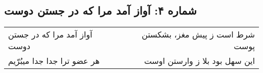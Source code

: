 \begin{center}
\section*{شماره ۴: آواز آمد مرا که در جستن دوست}
\label{sec:004}
\begin{longtable}{l p{0.5cm} r}
آواز آمد مرا که در جستن دوست
&&
شرط است ز پیش مغز، بشکستن پوست
\\
هر عضو ترا جدا جدا میبُرّیم
&&
این سهل بود بلا ز وارستن اوست
\\
\end{longtable}
\end{center}

